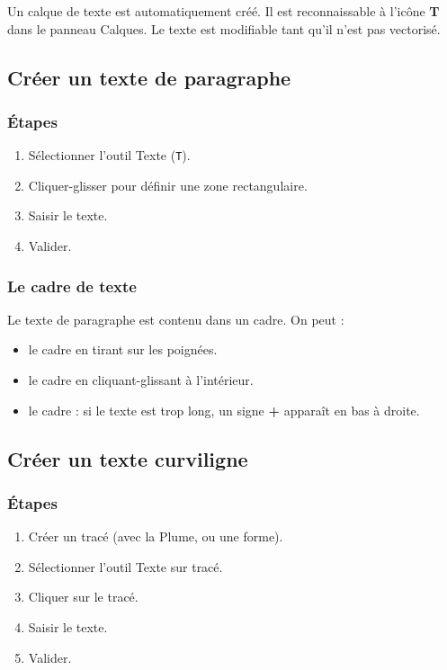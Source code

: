 Un calque de texte est automatiquement créé. Il est reconnaissable à l'icône \textbf{T} dans le panneau Calques. Le texte est modifiable tant qu'il n'est pas vectorisé.

\subsection{Créer un texte de paragraphe}

\subsubsection{Étapes}

\begin{enumerate}
    \item Sélectionner l'outil Texte (\texttt{T}).
    \item Cliquer-glisser pour définir une zone rectangulaire.
    \item Saisir le texte.
    \item Valider.
\end{enumerate}

\subsubsection{Le cadre de texte}

Le texte de paragraphe est contenu dans un cadre. On peut :

\begin{itemize}
    \item {} le cadre en tirant sur les poignées.
    \item {} le cadre en cliquant-glissant à l'intérieur.
    \item {} le cadre : si le texte est trop long, un signe \textbf{+} apparaît en bas à droite.
\end{itemize}

\subsection{Créer un texte curviligne}

\subsubsection{Étapes}

\begin{enumerate}
    \item Créer un tracé (avec la Plume, ou une forme).
    \item Sélectionner l'outil Texte sur tracé.
    \item Cliquer sur le tracé.
    \item Saisir le texte.
    \item Valider.
\end{enumerate}

